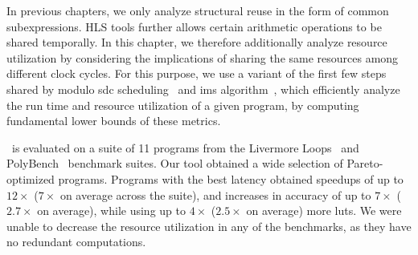 In previous chapters, we only analyze structural reuse in the form of common
subexpressions.  HLS tools further allows certain arithmetic operations to be
shared temporally.  In this chapter, we therefore additionally analyze resource
utilization by considering the implications of sharing the same resources among
different clock cycles.  For this purpose, we use a variant of the first few
steps shared by modulo \gls{sdc} scheduling~\cite{canis14} and \acrfull{ims}
algorithm~\cite{rau94}, which efficiently analyze the run time and resource
utilization of a given program, by computing fundamental lower bounds of these
metrics.

\soap~is evaluated on a suite of 11 programs from the Livermore
Loops~\cite{livermore} and PolyBench~\cite{polybench} benchmark suites.  Our
tool obtained a wide selection of Pareto-optimized programs.  Programs with
the best latency obtained speedups of up to $12\times$ ($7\times$ on average
across the suite), and increases in accuracy of up to $7\times$ ($2.7\times$
on average), while using up to $4\times$ ($2.5\times$ on average) more
\glspl{lut}.  We were unable to decrease the resource utilization in any of the
benchmarks, as they have no redundant computations.


